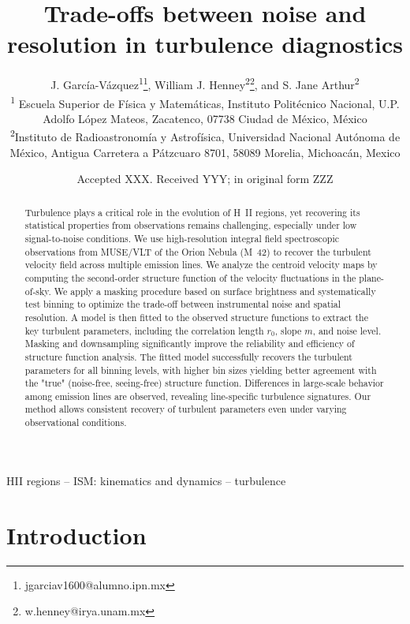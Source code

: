 \documentclass[fleqn,usenatbib, useAMS, a4paper]{mnras}
\title[Turbulence diagnostic trade-offs]{Trade-offs between noise and resolution in turbulence diagnostics}
\author[J. García-Vázquez et al.]{
  J. García-Vázquez\textsuperscript{1}\thanks{jgarciav1600@alumno.ipn.mx},
  William J. Henney\textsuperscript{2}\thanks{w.henney@irya.unam.mx},
  and S. Jane Arthur\textsuperscript{2}
  \\
  \textsuperscript{1}\foreignlanguage{spanish}{%
    Escuela Superior de Física y Matemáticas, Instituto Politécnico Nacional, U.P. Adolfo López Mateos, Zacatenco, 07738 Ciudad de México, México}\\
  \textsuperscript{2}Instituto de Radioastronomía y Astrofísica,
    Universidad Nacional Autónoma de México,
    Antigua Carretera a Pátzcuaro 8701,
    58089 Morelia, Michoacán, Mexico\\
}
\date{Accepted XXX. Received YYY; in original form ZZZ}
\begin{document}
\label{firstpage}
\pagerange{\pageref{firstpage}--\pageref{lastpage}}
\maketitle

\begin{abstract}
  Turbulence plays a critical role in the evolution of H~II regions, yet recovering its statistical properties from observations remains challenging, especially under low signal-to-noise conditions.
  We use high-resolution integral field spectroscopic observations from MUSE/VLT of the Orion Nebula (M~42) to recover the turbulent velocity field across multiple emission lines.
  We analyze the centroid velocity maps by computing the second-order structure function of the velocity fluctuations in the plane-of-sky. We apply a masking procedure based on surface brightness and systematically test binning to optimize the trade-off between instrumental noise and spatial resolution. A model is then fitted to the observed structure functions to extract the key turbulent parameters, including the correlation length $r_0$, slope $m$, and noise level.
  Masking and downsampling significantly improve the reliability and efficiency of structure function analysis. The fitted model successfully recovers the turbulent parameters for all binning levels, with higher bin sizes yielding better agreement with the "true" (noise-free, seeing-free) structure function. Differences in large-scale behavior among emission lines are observed, revealing line-specific turbulence signatures. Our method allows consistent recovery of turbulent parameters even under varying observational conditions. %
\end{abstract}

\begin{keywords}
HII regions -- ISM: kinematics and dynamics -- turbulence 
\end{keywords}




\section{Introduction}
\end{document}
